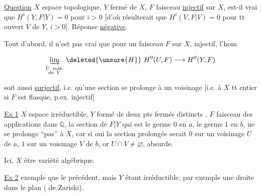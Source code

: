 
\uline{Question} $X$ espace topologique, $Y$ fermé de $X$, $F$ faisceau \uline{injectif} sur $X$, est-il vrai que $H^i(Y,F|Y)=0$ pour $i>0$ [d'où résulterait que $H^i(V,F|V)=0$ pour tt ouvert $V$ de $Y$, $i>0$]. Réponse \uline{négative}.

Tout d'abord, il n'est pas vrai que pour un faisceau $F$ sur $X$,  injectif, l'hom 

\[
\underset{\substack{U\ \mathrm{vois.}\\ \mathrm{de}\ Y}}{\underrightarrow{\lim}}\ \deleted{\unsure{H}}\ H^0(U,F)\longrightarrow H^0(Y,F)
\]

soit aussi \uline{surjectif}, i.e. qu'une section se prolonge à un voisinage [i.e. à $X$ tt entier si $F$ est flasque, p.ex. injectif]

\uline{Ex 1} $X$ espace irréductible, $Y$ formé de deux pts fermés distincts , $F$ faisceau des applications  dans $\mathbb{Q}$, la section de $F|Y$ qui est le germe $0$ en $a$, le germe $1$ en $b$, ne se prolonge ``pas'' \deleted{\unsure{[à la}} à  $X$, car si oui la section prolongée serait $0$ sur un voisinage $U$ de $a$, $1$ sur un voisinage $V$ de $b$, or $U\cap V\ne\varnothing$, absurde.


Ici, $X$  être variété algébrique.

\uline{Ex 2}  exemple  que le précédent, mais $Y$ étant irréductible, par exemple une droite dans le plan ( de Zariski).

